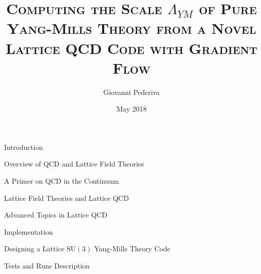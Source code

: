 \documentclass[twoside,english, a4paper, 11pt]{shared/uiofysmaster}
\author{Giovanni Pederiva}
\title{{\scshape Computing the Scale $\Lambda_{YM}$ of Pure Yang-Mills Theory from a Novel Lattice QCD Code with Gradient Flow}}
\date{May 2018}
\begin{document}


\maketitle
\clearpage



\begin{abstract}
	
	\cleardoublepage
	\begin{acknowledgements}
		
	\end{acknowledgements}
	\clearpage
\end{abstract}
\tableofcontents
\clearpage 

\begin{chapter}{Introduction}
	\label{chap:intro}
	  
\end{chapter}

\begin{part}{Overview of QCD and Lattice Field Theories}
	\label{part:intro}
	\begin{chapter}{A Primer on QCD in the Continuum}
		\label{chap:qcd_intro}
  		
	\end{chapter}

	\begin{chapter}{Lattice Field Theories and Lattice QCD}
		\label{chap:lattice_intro}
	  	
	\end{chapter}

	\begin{chapter}{Advanced Topics in Lattice QCD}
		\label{chap:grad_intro}
	  	
	\end{chapter}

\end{part}


\begin{part}{Implementation}
	\label{part:implementation}
	\begin{chapter}{Designing a Lattice $\mathrm{SU(3)}$ Yang-Mills Theory Code}
  		\label{chap:code_design}
  		
	\end{chapter}

	\begin{chapter}{Tests and Runs Description}
		\label{chap:test_runs}
		
  \end{chapter}
\end{part}
\end{document}
